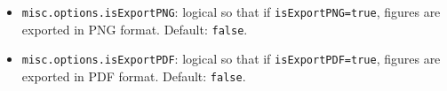 \begin{itemize}
\begin{itemize}
\item \lstinline[basicstyle = \mlttfamily \small ]!misc.options.isExportPNG!: logical so that if \lstinline[basicstyle = \mlttfamily \small ]!isExportPNG=true!,  figures are exported in PNG format. Default: \lstinline[basicstyle = \mlttfamily \small ]!false!.
\item \lstinline[basicstyle = \mlttfamily \small ]!misc.options.isExportPDF!: logical so that if \lstinline[basicstyle = \mlttfamily \small ]!isExportPDF=true!,  figures are exported in PDF format. Default: \lstinline[basicstyle = \mlttfamily \small ]!false!.
\end{itemize}
\end{itemize}